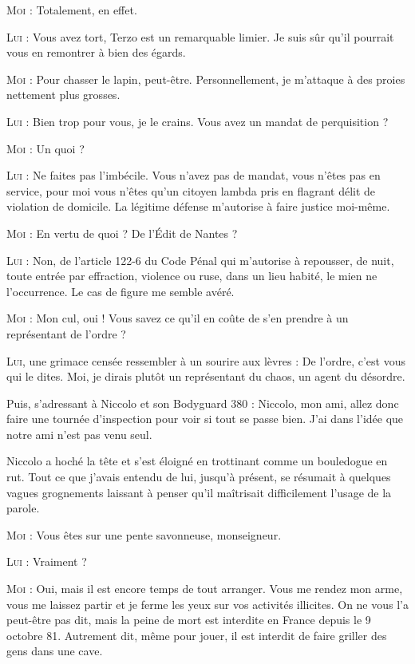 \textsc{Moi} : Totalement, en effet.

\textsc{Lui} : Vous avez tort, Terzo est un remarquable limier. Je suis sûr qu’il pourrait vous en remontrer à bien des égards.

\textsc{Moi} : Pour chasser le lapin, peut-être. Personnellement, je m’attaque à des proies nettement plus grosses.

\textsc{Lui} : Bien trop pour vous, je le crains. Vous avez un mandat de perquisition ?

\textsc{Moi} : Un quoi ?

\textsc{Lui} : Ne faites pas l’imbécile. Vous n’avez pas de mandat, vous n’êtes pas en service, pour moi vous n’êtes qu’un citoyen lambda pris en flagrant délit de violation de domicile. La légitime défense m’autorise à faire justice moi-même.

\textsc{Moi} : En vertu de quoi ? De l’Édit de Nantes ?

\textsc{Lui} : Non, de l’article 122-6 du Code Pénal qui m’autorise à repousser, de nuit, toute entrée par effraction, violence ou ruse, dans un lieu habité, le mien ne l’occurrence. Le cas de figure me semble avéré.

\textsc{Moi} : Mon cul, oui ! Vous savez ce qu’il en coûte de s’en prendre à un représentant de l’ordre ?

\textsc{Lui}, une grimace censée ressembler à un sourire aux lèvres : De l’ordre, c’est vous qui le dites. Moi, je dirais plutôt un représentant du chaos, un agent du désordre.

Puis, s’adressant à Niccolo et son Bodyguard 380 : Niccolo, mon ami, allez donc faire une tournée d’inspection pour voir si tout se passe bien. J’ai dans l’idée que notre ami n’est pas venu seul.

Niccolo a hoché la tête et s’est éloigné en trottinant comme un bouledogue en rut. Tout ce que j’avais entendu de lui, jusqu’à présent, se résumait à quelques vagues grognements laissant à penser qu’il maîtrisait difficilement l’usage de la parole.

\textsc{Moi} : Vous êtes sur une pente savonneuse, monseigneur.

\textsc{Lui} : Vraiment ?

\textsc{Moi} : Oui, mais il est encore temps de tout arranger. Vous me rendez mon arme, vous me laissez partir et je ferme les yeux sur vos activités illicites. On ne vous l’a peut-être pas dit, mais la peine de mort est interdite en France depuis le 9 octobre 81. Autrement dit, même pour jouer, il est interdit de faire griller des gens dans une cave.

